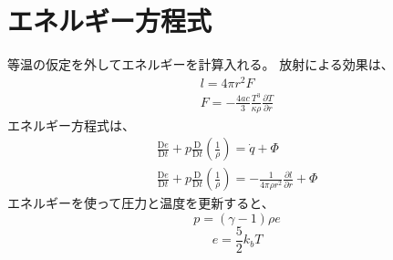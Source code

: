 \documentclass{jsarticle}
\newcommand{\pder}[2][]{\frac{\partial#1}{\partial#2}}
\newcommand{\Dder}[2][]{\frac{\mathrm{D}#1}{\mathrm{D}#2}}
\begin{document}
\section{エネルギー方程式}
等温の仮定を外してエネルギーを計算入れる。
放射による効果は、
\begin{align}
    l = 4\pi r^2 F\\
    F = - \frac{4ac}{3} \frac{T^3}{\kappa \rho}\pder[T]{r}
\end{align}
エネルギー方程式は、
\begin{align}
    \Dder[e]{t} + p \Dder[]{t}(\frac{1}{\rho}) = \dot{q} + \Phi\\
    \Dder[e]{t} + p \Dder[]{t}(\frac{1}{\rho}) = - \frac{1}{4\pi\rho r^2}\pder[l]{r} + \Phi
\end{align}    
エネルギーを使って圧力と温度を更新すると、
\begin{equation}
    p = (\gamma - 1) \rho e
\end{equation}
\begin{equation}
    e = \frac{5}{2}k_bT
\end{equation}


\end{document}
